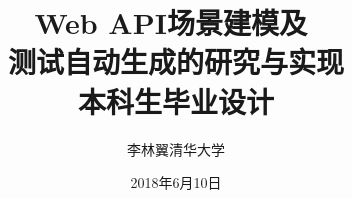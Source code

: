 \documentclass[a4paper]{ctexbook}
\begin{document}
\title{Web API场景建模及 \\测试自动生成的研究与实现\\{\small 本科生毕业设计}}
\author{李林翼\quad 清华大学}
\date{2018年6月10日}
\maketitle

\tableofcontents

\graphicspath{{figures/}}








% 
% 



\end{document}
